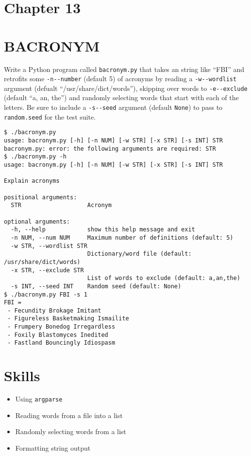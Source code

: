 \documentclass[]{article}
\providecommand{\tightlist}{%
  \setlength{\itemsep}{0pt}\setlength{\parskip}{0pt}}
\begin{document}
\pagebreak

\hypertarget{chapter-13}{%
\section{Chapter 13}\label{chapter-13}}

\hypertarget{bacronym}{%
\section{BACRONYM}\label{bacronym}}

Write a Python program called \texttt{bacronym.py} that takes an string
like ``FBI'' and retrofits some \texttt{-n\textbar{}-\/-number} (default
5) of acronyms by reading a \texttt{-w\textbar{}-\/-wordlist} argument
(defualt ``/usr/share/dict/words''), skipping over words to
\texttt{-e\textbar{}-\/-exclude} (default ``a, an, the'') and randomly
selecting words that start with each of the letters. Be sure to include
a \texttt{-s\textbar{}-\/-seed} argument (default \texttt{None}) to pass
to \texttt{random.seed} for the test suite.

\begin{verbatim}
$ ./bacronym.py
usage: bacronym.py [-h] [-n NUM] [-w STR] [-x STR] [-s INT] STR
bacronym.py: error: the following arguments are required: STR
$ ./bacronym.py -h
usage: bacronym.py [-h] [-n NUM] [-w STR] [-x STR] [-s INT] STR

Explain acronyms

positional arguments:
  STR                   Acronym

optional arguments:
  -h, --help            show this help message and exit
  -n NUM, --num NUM     Maximum number of definitions (default: 5)
  -w STR, --wordlist STR
                        Dictionary/word file (default: /usr/share/dict/words)
  -x STR, --exclude STR
                        List of words to exclude (default: a,an,the)
  -s INT, --seed INT    Random seed (default: None)
$ ./bacronym.py FBI -s 1
FBI =
 - Fecundity Brokage Imitant
 - Figureless Basketmaking Ismailite
 - Frumpery Bonedog Irregardless
 - Foxily Blastomyces Inedited
 - Fastland Bouncingly Idiospasm
\end{verbatim}

\hypertarget{skills-2}{%
\section{Skills}\label{skills-2}}

\begin{itemize}
\tightlist
\item
  Using \texttt{argparse}
\item
  Reading words from a file into a list
\item
  Randomly selecting words from a list
\item
  Formatting string output
\end{itemize}
\end{document}
